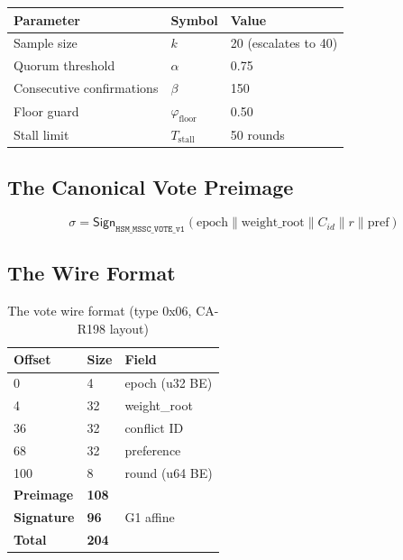 \documentclass[11pt, a4paper]{article}
\begin{document}
\begin{table}[h]
\centering
{}
\begin{tabular}{lll}
\rowcolor{hsmaTeal!20} \textbf{Parameter} & \textbf{Symbol} & \textbf{Value} \\
\midrule
Sample size & $k$ & 20 (escalates to 40) \\
Quorum threshold & $\alpha$ & 0.75 \\
Consecutive confirmations & $\beta$ & 150 \\
Floor guard & $\varphi_{\text{floor}}$ & 0.50 \\
Stall limit & $T_{\text{stall}}$ & 50 rounds \\
\bottomrule
\end{tabular}
\end{table}

\subsection{The Canonical Vote Preimage}

\begin{equation}
\sigma = \mathsf{Sign}_{\texttt{HSM\_MSSC\_VOTE\_v1}}\!\left(
\text{epoch} \| \text{weight\_root} \| C_{id} \| r \| \text{pref}
\right)
\end{equation}

\subsection{The Wire Format}

\begin{table}[h]
\centering
{}
\begin{tabular}{lll}
\rowcolor{hsmaTeal!20} \textbf{Offset} & \textbf{Size} & \textbf{Field} \\
\midrule
0 & 4 & epoch (u32 BE) \\
4 & 32 & weight\_root \\
36 & 32 & conflict ID \\
68 & 32 & preference \\
100 & 8 & round (u64 BE) \\
\midrule
\textbf{Preimage} & \textbf{108} & \\
\textbf{Signature} & \textbf{96} & G1 affine \\
\textbf{Total} & \textbf{204} & \\
\bottomrule
\end{tabular}
\caption{The vote wire format (type 0x06, CA-R198 layout)}
\end{table}
\end{document}
